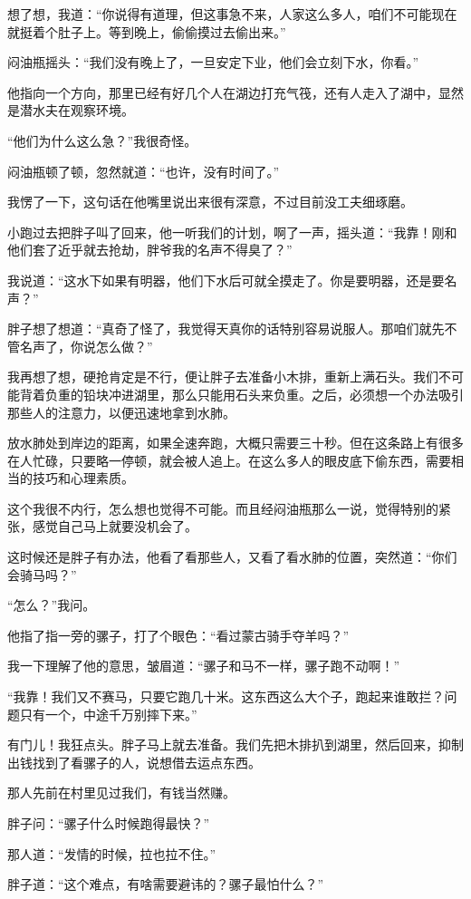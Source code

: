 想了想，我道：“你说得有道理，但这事急不来，人家这么多人，咱们不可能现在就挺着个肚子上。等到晚上，偷偷摸过去偷出来。”

闷油瓶摇头：“我们没有晚上了，一旦安定下业，他们会立刻下水，你看。”

他指向一个方向，那里已经有好几个人在湖边打充气筏，还有人走入了湖中，显然是潜水夫在观察环境。

“他们为什么这么急？”我很奇怪。

闷油瓶顿了顿，忽然就道：“也许，没有时间了。”

我愣了一下，这句话在他嘴里说出来很有深意，不过目前没工夫细琢磨。

小跑过去把胖子叫了回来，他一听我们的计划，啊了一声，摇头道：“我靠！刚和他们套了近乎就去抢劫，胖爷我的名声不得臭了？”

我说道：“这水下如果有明器，他们下水后可就全摸走了。你是要明器，还是要名声？”

胖子想了想道：“真奇了怪了，我觉得天真你的话特别容易说服人。那咱们就先不管名声了，你说怎么做？”

我再想了想，硬抢肯定是不行，便让胖子去准备小木排，重新上满石头。我们不可能背着负重的铅块冲进湖里，那么只能用石头来负重。之后，必须想一个办法吸引那些人的注意力，以便迅速地拿到水肺。

放水肺处到岸边的距离，如果全速奔跑，大概只需要三十秒。但在这条路上有很多在人忙碌，只要略一停顿，就会被人追上。在这么多人的眼皮底下偷东西，需要相当的技巧和心理素质。

这个我很不内行，怎么想也觉得不可能。而且经闷油瓶那么一说，觉得特别的紧张，感觉自己马上就要没机会了。

这时候还是胖子有办法，他看了看那些人，又看了看水肺的位置，突然道：“你们会骑马吗？”

“怎么？”我问。

他指了指一旁的骡子，打了个眼色：“看过蒙古骑手夺羊吗？”

我一下理解了他的意思，皱眉道：“骡子和马不一样，骡子跑不动啊！”

“我靠！我们又不赛马，只要它跑几十米。这东西这么大个子，跑起来谁敢拦？问题只有一个，中途千万别摔下来。”

有门儿！我狂点头。胖子马上就去准备。我们先把木排扒到湖里，然后回来，抑制出钱找到了看骡子的人，说想借去运点东西。

那人先前在村里见过我们，有钱当然赚。

胖子问：“骡子什么时候跑得最快？”

那人道：“发情的时候，拉也拉不住。”

胖子道：“这个难点，有啥需要避讳的？骡子最怕什么？”

